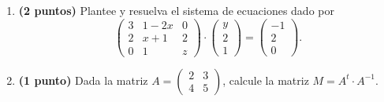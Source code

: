 
\begin{enumerate}[label=\alph*)]
\item \textbf{(2 puntos)} Plantee y resuelva el sistema de ecuaciones dado por
\[
\begin{pmatrix}3&1-2x&0\\2&x+1&2\\0&1&z\end{pmatrix}\cdot\begin{pmatrix}y\\2\\1\end{pmatrix}=\begin{pmatrix}-1\\2\\0\end{pmatrix}.
\]
\item \textbf{(1 punto)} Dada la matriz $A=\begin{pmatrix}2&3\\4&5\end{pmatrix}$, calcule la matriz $M=A^t\cdot A^{-1}$.
\end{enumerate}
